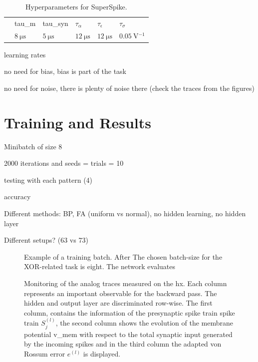 \begin{table}\centering{}
	\begin{tabular}{@{}rlllll@{}}\toprule
		 & \gls{tau_m}		& \gls{tau_syn} 	& $\tau_\alpha$	& $\tau_\epsilon$ & $\tau_\sigma$\\ 
		 & $\SI{8}{\micro \s}$	& $\SI{5}{\micro \s}$& $\SI{12}{\micro \s}$&$\SI{12}{\micro\s}$&$\SI{0.05}{\V^{-1}}$\\ \bottomrule
		 \end{tabular}
	\caption[Temporal Constants for SuperSpike.]{Hyperparameters for SuperSpike. }
\end{table}

learning rates

no need for bias, bias is part of the task

no need for noise, there is plenty of noise there (check the traces from the figures)

\section{Training and Results}

Minibatch of size 8

2000 iterations and seeds = trials = 10

testing with each pattern (4)

accuracy

Different methods: BP, FA (uniform vs normal), no hidden learning, no hidden layer

Different setups? (63 vs 73)


\begin{figure}
	\centering
	
	\caption[Example of a training batch.]{Example of a training batch. After The chosen batch-size for the XOR-related task is eight. The network evaluates}
	\label{inputofabatch}
\end{figure}


\begin{figure}
	\centering
	
	\caption[Monitoring of the analog traces measured on the \gls{hx}.]{Monitoring of the analog traces measured on the \gls{hx}. Each column represents an important observable for the backward pass. The hidden and output layer are discriminated row-wise. The first column, contains the information of the presynaptic spike train spike train $S_j^{(l)}$, the second column shows the evolution of the membrane potential \gls{v_mem} with respect to the total synaptic input generated by the incoming spikes and in the third column the adapted von Rossum error $e^{(l)}$ is displayed.}
	\label{debugplot}
\end{figure}


